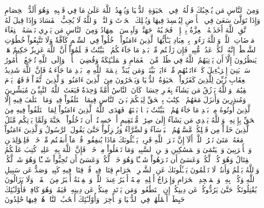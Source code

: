 وَمِنَ ٱلنَّاسِ مَن يُعۡجِبُكَ قَوۡلُهُۥ فِي ٱلۡحَيَوٰةِ ٱلدُّنۡيَا وَيُشۡهِدُ ٱللَّهَ عَلَىٰ مَا فِي قَلۡبِهِۦ وَهُوَ أَلَدُّ ٱلۡخِصَامِ
وَإِذَا تَوَلَّىٰ سَعَىٰ فِي ٱلۡأَرۡضِ لِيُفۡسِدَ فِيهَا وَيُهۡلِكَ ٱلۡحَرۡثَ وَٱلنَّسۡلَۚ وَٱللَّهُ لَا يُحِبُّ ٱلۡفَسَادَ
وَإِذَا قِيلَ لَهُ ٱتَّقِ ٱللَّهَ أَخَذَتۡهُ ٱلۡعِزَّةُ بِٱلۡإِثۡمِۚ فَحَسۡبُهُۥ جَهَنَّمُۖ وَلَبِئۡسَ ٱلۡمِهَادُ
وَمِنَ ٱلنَّاسِ مَن يَشۡرِي نَفۡسَهُ ٱبۡتِغَآءَ مَرۡضَاتِ ٱللَّهِۚ وَٱللَّهُ رَءُوفُۢ بِٱلۡعِبَادِ
يَـٰٓأَيُّهَا ٱلَّذِينَ ءَامَنُواْ ٱدۡخُلُواْ فِي ٱلسِّلۡمِ كَآفَّةٗ وَلَا تَتَّبِعُواْ خُطُوَٰتِ ٱلشَّيۡطَٰنِۚ إِنَّهُۥ لَكُمۡ عَدُوّٞ مُّبِينٞ
فَإِن زَلَلۡتُم مِّنۢ بَعۡدِ مَا جَآءَتۡكُمُ ٱلۡبَيِّنَٰتُ فَٱعۡلَمُوٓاْ أَنَّ ٱللَّهَ عَزِيزٌ حَكِيمٌ
هَلۡ يَنظُرُونَ إِلَّآ أَن يَأۡتِيَهُمُ ٱللَّهُ فِي ظُلَلٖ مِّنَ ٱلۡغَمَامِ وَٱلۡمَلَـٰٓئِكَةُ وَقُضِيَ ٱلۡأَمۡرُۚ وَإِلَى ٱللَّهِ تُرۡجَعُ ٱلۡأُمُورُ
سَلۡ بَنِيٓ إِسۡرَـٰٓءِيلَ كَمۡ ءَاتَيۡنَٰهُم مِّنۡ ءَايَةِۭ بَيِّنَةٖۗ وَمَن يُبَدِّلۡ نِعۡمَةَ ٱللَّهِ مِنۢ بَعۡدِ مَا جَآءَتۡهُ فَإِنَّ ٱللَّهَ شَدِيدُ ٱلۡعِقَابِ
زُيِّنَ لِلَّذِينَ كَفَرُواْ ٱلۡحَيَوٰةُ ٱلدُّنۡيَا وَيَسۡخَرُونَ مِنَ ٱلَّذِينَ ءَامَنُواْۘ وَٱلَّذِينَ ٱتَّقَوۡاْ فَوۡقَهُمۡ يَوۡمَ ٱلۡقِيَٰمَةِۗ وَٱللَّهُ يَرۡزُقُ مَن يَشَآءُ بِغَيۡرِ حِسَابٖ
كَانَ ٱلنَّاسُ أُمَّةٗ وَٰحِدَةٗ فَبَعَثَ ٱللَّهُ ٱلنَّبِيِّـۧنَ مُبَشِّرِينَ وَمُنذِرِينَ وَأَنزَلَ مَعَهُمُ ٱلۡكِتَٰبَ بِٱلۡحَقِّ لِيَحۡكُمَ بَيۡنَ ٱلنَّاسِ فِيمَا ٱخۡتَلَفُواْ فِيهِۚ وَمَا ٱخۡتَلَفَ فِيهِ إِلَّا ٱلَّذِينَ أُوتُوهُ مِنۢ بَعۡدِ مَا جَآءَتۡهُمُ ٱلۡبَيِّنَٰتُ بَغۡيَۢا بَيۡنَهُمۡۖ فَهَدَى ٱللَّهُ ٱلَّذِينَ ءَامَنُواْ لِمَا ٱخۡتَلَفُواْ فِيهِ مِنَ ٱلۡحَقِّ بِإِذۡنِهِۦۗ وَٱللَّهُ يَهۡدِي مَن يَشَآءُ إِلَىٰ صِرَٰطٖ مُّسۡتَقِيمٍ
أَمۡ حَسِبۡتُمۡ أَن تَدۡخُلُواْ ٱلۡجَنَّةَ وَلَمَّا يَأۡتِكُم مَّثَلُ ٱلَّذِينَ خَلَوۡاْ مِن قَبۡلِكُمۖ مَّسَّتۡهُمُ ٱلۡبَأۡسَآءُ وَٱلضَّرَّآءُ وَزُلۡزِلُواْ حَتَّىٰ يَقُولَ ٱلرَّسُولُ وَٱلَّذِينَ ءَامَنُواْ مَعَهُۥ مَتَىٰ نَصۡرُ ٱللَّهِۗ أَلَآ إِنَّ نَصۡرَ ٱللَّهِ قَرِيبٞ
يَسۡـَٔلُونَكَ مَاذَا يُنفِقُونَۖ قُلۡ مَآ أَنفَقۡتُم مِّنۡ خَيۡرٖ فَلِلۡوَٰلِدَيۡنِ وَٱلۡأَقۡرَبِينَ وَٱلۡيَتَٰمَىٰ وَٱلۡمَسَٰكِينِ وَٱبۡنِ ٱلسَّبِيلِۗ وَمَا تَفۡعَلُواْ مِنۡ خَيۡرٖ فَإِنَّ ٱللَّهَ بِهِۦ عَلِيمٞ
كُتِبَ عَلَيۡكُمُ ٱلۡقِتَالُ وَهُوَ كُرۡهٞ لَّكُمۡۖ وَعَسَىٰٓ أَن تَكۡرَهُواْ شَيۡـٔٗا وَهُوَ خَيۡرٞ لَّكُمۡۖ وَعَسَىٰٓ أَن تُحِبُّواْ شَيۡـٔٗا وَهُوَ شَرّٞ لَّكُمۡۚ وَٱللَّهُ يَعۡلَمُ وَأَنتُمۡ لَا تَعۡلَمُونَ
يَسۡـَٔلُونَكَ عَنِ ٱلشَّهۡرِ ٱلۡحَرَامِ قِتَالٖ فِيهِۖ قُلۡ قِتَالٞ فِيهِ كَبِيرٞۚ وَصَدٌّ عَن سَبِيلِ ٱللَّهِ وَكُفۡرُۢ بِهِۦ وَٱلۡمَسۡجِدِ ٱلۡحَرَامِ وَإِخۡرَاجُ أَهۡلِهِۦ مِنۡهُ أَكۡبَرُ عِندَ ٱللَّهِۚ وَٱلۡفِتۡنَةُ أَكۡبَرُ مِنَ ٱلۡقَتۡلِۗ وَلَا يَزَالُونَ يُقَٰتِلُونَكُمۡ حَتَّىٰ يَرُدُّوكُمۡ عَن دِينِكُمۡ إِنِ ٱسۡتَطَٰعُواْۚ وَمَن يَرۡتَدِدۡ مِنكُمۡ عَن دِينِهِۦ فَيَمُتۡ وَهُوَ كَافِرٞ فَأُوْلَـٰٓئِكَ حَبِطَتۡ أَعۡمَٰلُهُمۡ فِي ٱلدُّنۡيَا وَٱلۡأٓخِرَةِۖ وَأُوْلَـٰٓئِكَ أَصۡحَٰبُ ٱلنَّارِۖ هُمۡ فِيهَا خَٰلِدُونَ
